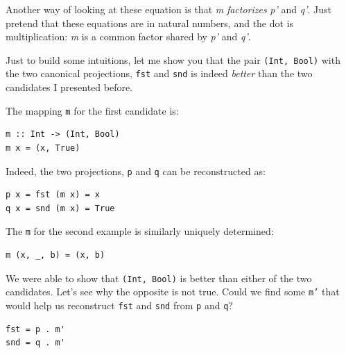 \noindent
Another way of looking at these equation is that \emph{m}
\emph{factorizes} \emph{p'} and \emph{q'}. Just pretend that these
equations are in natural numbers, and the dot is multiplication:
\emph{m} is a common factor shared by \emph{p'} and \emph{q'}.

Just to build some intuitions, let me show you that the pair
\texttt{(Int,\ Bool)} with the two canonical projections, \texttt{fst}
and \texttt{snd} is indeed \emph{better} than the two candidates I
presented before.

\begin{figure}[H]
  \centering
\end{figure}

\noindent
The mapping \texttt{m} for the first candidate is:

\begin{verbatim}
m :: Int -> (Int, Bool)
m x = (x, True)
\end{verbatim}

\noindent
Indeed, the two projections, \texttt{p} and \texttt{q} can be
reconstructed as:

\begin{verbatim}
p x = fst (m x) = x
q x = snd (m x) = True
\end{verbatim}

\noindent
The \texttt{m} for the second example is similarly uniquely determined:

\begin{verbatim}
m (x, _, b) = (x, b)
\end{verbatim}

\noindent
We were able to show that \texttt{(Int,\ Bool)} is better than either of
the two candidates. Let's see why the opposite is not true. Could we
find some \texttt{m'} that would help us reconstruct \texttt{fst}
and \texttt{snd} from \texttt{p} and \texttt{q}?

\begin{verbatim}
fst = p . m'
snd = q . m'
\end{verbatim}

